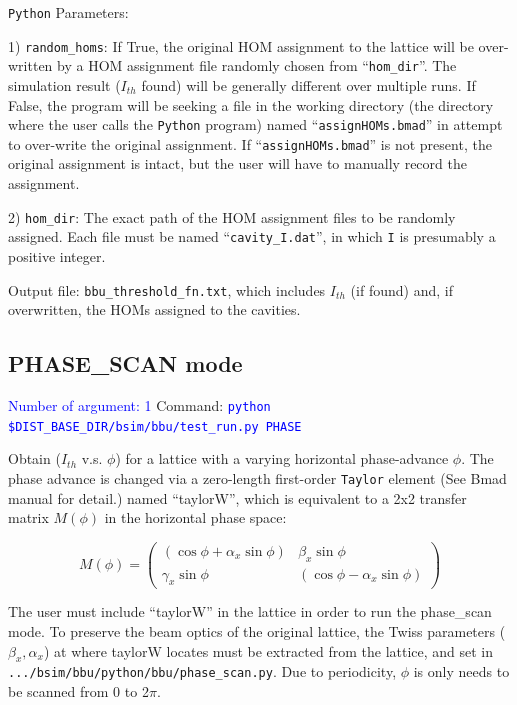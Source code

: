 \documentclass{hitec}
\begin{document}
\bigbreak
\texttt{Python} Parameters:

1) \texttt{random_homs}: If True, the original HOM assignment to the lattice will be over-written by a HOM assignment file  randomly chosen from ``\texttt{hom_dir}''.
The simulation result ($I_{th}$ found) will be generally different over multiple runs. 
If False, the program will be seeking a file in the working directory (the directory where the user calls the \texttt{Python} program) named ``\texttt{assignHOMs.bmad}'' in attempt to over-write the original assignment. If ``\texttt{assignHOMs.bmad}'' is not present, the original assignment is intact, but the user will have to manually record the assignment. 

2) \texttt{hom_dir}:
The exact path of the HOM assignment files to be randomly assigned. Each file must be named ``\texttt{cavity_I.dat}'', in which \texttt{I} is presumably a positive integer.

\bigbreak
Output file:  \texttt{bbu_threshold_fn.txt}, which includes $I_{th}$ (if found) and, if overwritten, the HOMs assigned to the cavities.

\subsection{PHASE_SCAN mode}
\textcolor{blue}{Number of argument: 1}
\bigbreak
Command:  \textcolor{blue}{\texttt{python \$DIST_BASE_DIR/bsim/bbu/test_run.py  PHASE}}

Obtain ($I_{th}$ v.s. $\phi$) for a lattice with a varying horizontal phase-advance $\phi$. The phase advance is changed via a zero-length first-order \texttt{Taylor} element (See Bmad manual for detail.) named ``taylorW'', which is equivalent to a 2x2 transfer matrix $M(\phi)$ in the horizontal phase space:

\[
M(\phi) =
\begin{pmatrix}
   (\cos\phi+\alpha_{x}\sin\phi) & \beta_{x}\sin\phi \\ 
  \gamma_{x}\sin\phi &  (\cos\phi-\alpha_{x}\sin\phi)
\end{pmatrix}
\]


The user must include ``taylorW'' in the lattice in order to run the phase_scan mode. To preserve the beam optics of the original lattice, the Twiss parameters ($\beta_x, \alpha_x$) at where taylorW locates must be extracted from the lattice, and set in \texttt{.../bsim/bbu/python/bbu/phase_scan.py}. Due to periodicity, $\phi$ is only needs to be scanned from 0 to 2$\pi$.
       
\end{document}
